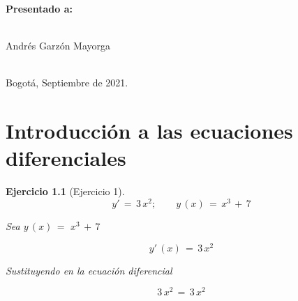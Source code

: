 \documentclass[a4paper,11pt,openany]{book}
\newtheorem{ejer}{Ejercicio}[section]
\begin{document}
\begin{titlepage}
\begin{center}
\begin{large}
\end{large} 

\vspace*{0.3in} 

\end{center} 

\begin{center} 

{\bf Presentado a:} \\ 

\  

Andrés Garzón Mayorga \\ 

\ 

Bogot{\'a}, Septiembre de 2021. 

\end{center} 

\end{titlepage} 

\tableofcontents 

\chapter{Introducción a las ecuaciones diferenciales} 

\begin{ejer}[Ejercicio 1] 

$$y'\,=\,3\,x^{2}; \qquad \boxed{y\,(x)\,=\,x^{3}\,+\,7}$$
 
 Sea $y\,(x)\,=\,\,x^{3}\,+\,7$
 
 $$y'\,(x)\,=\,3\,x^{2}$$
 
 
 Sustituyendo en la ecuación diferencial
 
 $$\boxed{{3\,x^{2}}\,=\,3\,x^{2}}$$
    
\end{ejer} 
\end{document}
